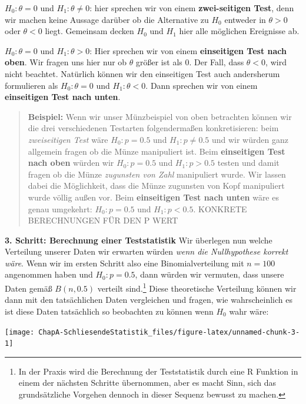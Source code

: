 \documentclass[]{book}
\let\rmarkdownfootnote\footnote%
\def\footnote{\protect\rmarkdownfootnote}
\begin{document}
\(H_0: \theta=0\) und \(H_1: \theta\neq 0\): hier sprechen wir von einem
\textbf{zwei-seitigen Test}, denn wir machen keine Aussage darüber ob
die Alternative zu \(H_0\) entweder in \(\theta>0\) oder \(\theta<0\)
liegt. Gemeinsam decken \(H_0\) und \(H_1\) hier alle möglichen
Ereignisse ab.

\(H_0: \theta=0\) und \(H_1: \theta> 0\): Hier sprechen wir von einem
\textbf{einseitigen Test nach oben}. Wir fragen uns hier nur ob
\(\theta\) größer ist als 0. Der Fall, dass \(\theta<0\), wird nicht
beachtet. Natürlich können wir den einseitigen Test auch andersherum
formulieren als \(H_0: \theta=0\) und \(H_1: \theta< 0\). Dann sprechen
wir von einem \textbf{einseitigen Test nach unten}.

\begin{quote}
\textbf{Beispiel:} Wenn wir unser Münzbeispiel von oben betrachten
können wir die drei verschiedenen Testarten folgendermaßen
konkretisieren: beim \emph{zweiseitigen Test} wäre \(H_0: p=0.5\) und
\(H_1: p\neq 0.5\) und wir würden ganz allgemein fragen ob die Münze
manipuliert ist. Beim \textbf{einseitigen Test nach oben} würden wir
\(H_0: p=0.5\) und \(H_1: p>0.5\) testen und damit fragen ob die Münze
\emph{zugunsten von Zahl} manipuliert wurde. Wir lassen dabei die
Möglichkeit, dass die Münze zugunsten von Kopf manipuliert wurde völlig
außen vor. Beim \textbf{einseitigen Test nach unten} wäre es genau
umgekehrt: \(H_0: p=0.5\) und \(H_1: p<0.5\). KONKRETE BERECHNUNGEN FÜR
DEN P WERT
\end{quote}

\textbf{3. Schritt: Berechnung einer Teststatistik} Wir überlegen nun
welche Verteilung unserer Daten wir erwarten würden \emph{wenn die
Nullhypothese korrekt wäre}. Wenn wir im ersten Schritt also eine
Binomialverteilung mit \(n=100\) angenommen haben und \(H_0: p=0.5\),
dann würden wir vermuten, dass unsere Daten gemäß \(B(n, 0.5)\) verteilt
sind.\footnote{In der Praxis wird die Berechnung der Teststatistik durch
  eine R Funktion in einem der nächsten Schritte übernommen, aber es
  macht Sinn, sich das grundsätzliche Vorgehen dennoch in dieser Sequenz
  bewusst zu machen.} Diese theoretische Verteilung können wir dann mit
den tatsächlichen Daten vergleichen und fragen, wie wahrscheinlich es
ist diese Daten tatsächlich so beobachten zu können wenn \(H_0\) wahr
wäre:

\begin{center}\texttt{[image: ChapA-SchliesendeStatistik\_files/figure-latex/unnamed-chunk-3-1]} \end{center}
\end{document}
